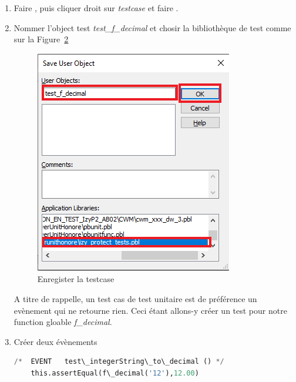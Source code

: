 \documentclass[french]{article}
\theoremstyle{definition}
\begin{document}
\begin{enumerate}
\begin{figure}[!htbp]
\begin{center}
    \label{fig:createTestLibrary}
    \end{center}
  \end{figure} 
  \item Faire  , puis cliquer droit sur \textit{testcase}  et faire  .
  \item Nommer l'object test \textit{test\_f\_decimal} et chosir la bibliothèque de test comme sur la Figure~\ref{fig:nameTestObject}
  \begin{figure}[!htbp]
    \begin{center}
    \includegraphics[width=1\linewidth]{./nameTestObject.png}
    \caption{Enregister la testcase}
    \label{fig:nameTestObject}
    \end{center}
  \end{figure} 
A titre de rappelle, un test cas de test unitaire est de préférence un evènement  qui ne retourne rien. 
Ceci étant allons-y créer un test pour notre function gloable \textit{f\_decimal}.
\item Créer deux évènements
\begin{lstlisting}[language=Python, caption= f\_decimal test 1]
    /*	EVENT	test\_integerString\_to\_decimal ()	*/
    this.assertEqual(f\_decimal('12'),12.00)
\end{lstlisting}


\end{enumerate}
\end{document}
